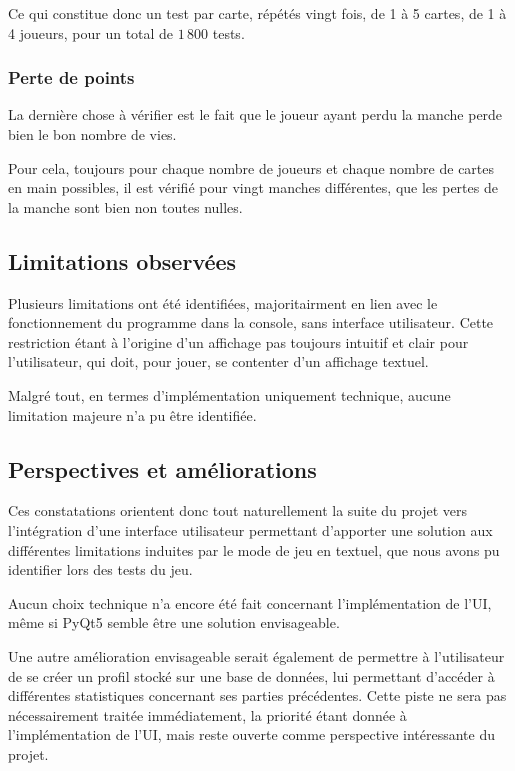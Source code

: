          Ce qui constitue donc un test par carte, répétés vingt fois, de 1 à 5 cartes, de 1 à 4 joueurs, pour un total de $1\,800$ tests.

      \subsubsection{Perte de points}
         La dernière chose à vérifier est le fait que le joueur ayant perdu la manche perde bien le bon nombre de vies.

         Pour cela, toujours pour chaque nombre de joueurs et chaque nombre de cartes en main possibles, il est vérifié pour vingt manches différentes, que les pertes de la manche sont bien non toutes nulles.

   \subsection{Limitations observées}\label{subsec:limitations-observées}
      Plusieurs limitations ont été identifiées, majoritairment en lien avec le fonctionnement du programme dans la console, sans interface utilisateur.
      Cette restriction étant à l'origine d'un affichage pas toujours intuitif et clair pour l'utilisateur, qui doit, pour jouer, se contenter d'un affichage textuel.

      Malgré tout, en termes d'implémentation uniquement technique, aucune limitation majeure n'a pu être identifiée.
   
   \subsection{Perspectives et améliorations}\label{subsec:perspectives-et-améliorations}
      Ces constatations orientent donc tout naturellement la suite du projet vers l'intégration d'une interface utilisateur permettant d'apporter une solution aux différentes limitations induites par le mode de jeu en textuel, que nous avons pu identifier lors des tests du jeu.

      Aucun choix technique n'a encore été fait concernant l'implémentation de l'UI, même si PyQt5 semble être une solution envisageable.

      Une autre amélioration envisageable serait également de permettre à l'utilisateur de se créer un profil stocké sur une base de données, lui permettant d'accéder à différentes statistiques concernant ses parties précédentes.
      Cette piste ne sera pas nécessairement traitée immédiatement, la priorité étant donnée à l'implémentation de l'UI\@, mais reste ouverte comme perspective intéressante du projet.

